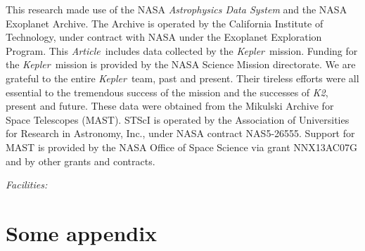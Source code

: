 \documentclass[12pt,preprint]{aastex}
\newcommand{\project}[1]{\textsl{#1}}
\newcommand{\kepler}{\project{Kepler}}
\newcommand{\KT}{\project{K2}}
\newcommand{\paper}{\textsl{Article}}
\newcommand{\figlabel}[1]{\label{fig:#1}}
\begin{document}
This research made use of the NASA \project{Astrophysics Data System} and the
NASA Exoplanet Archive.
The Archive is operated by the California Institute of Technology, under
contract with NASA under the Exoplanet Exploration Program.
This \paper\ includes data collected by the \kepler\ mission. Funding for the
\kepler\ mission is provided by the NASA Science Mission directorate.
We are grateful to the entire \kepler\ team, past and present.
Their tireless efforts were all essential to the tremendous success of the mission
and the successes of \KT, present and future.
These data were obtained from the Mikulski Archive for Space Telescopes
(MAST).
STScI is operated by the Association of Universities for Research in
Astronomy, Inc., under NASA contract NAS5-26555.
Support for MAST is provided by the NASA Office of Space Science via grant
NNX13AC07G and by other grants and contracts.

{\it Facilities:} 

\appendix

\section{Some appendix}

\clearpage

\clearpage


\end{document}
